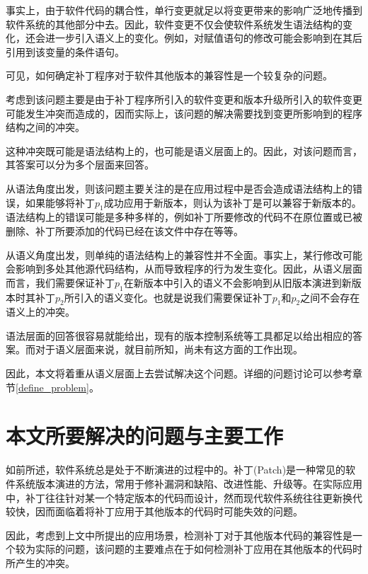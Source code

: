 事实上，由于软件代码的耦合性，单行变更就足以将变更带来的影响广泛地传播到软件系统的其他部分中去\cite{wilkerson2012software,tao2012software}。因此，软件变更不仅会使软件系统发生语法结构的变化，还会进一步引入语义上的变化。例如，对赋值语句的修改可能会影响到在其后引用到该变量的条件语句。

可见，如何确定补丁程序对于软件其他版本的兼容性是一个较复杂的问题。

考虑到该问题主要是由于补丁程序所引入的软件变更和版本升级所引入的软件变更可能发生冲突而造成的，因而实际上，该问题的解决需要找到变更所影响到的程序结构之间的冲突。

这种冲突既可能是语法结构上的，也可能是语义层面上的。因此，对该问题而言，其答案可以分为多个层面来回答。

从语法角度出发，则该问题主要关注的是在应用过程中是否会造成语法结构上的错误，如果能够将补丁$p_1$成功应用于新版本，则认为该补丁是可以兼容于新版本的。语法结构上的错误可能是多种多样的，例如补丁所要修改的代码不在原位置或已被删除、补丁所要添加的代码已经在该文件中存在等等。

从语义角度出发，则单纯的语法结构上的兼容性并不全面。事实上，某行修改可能会影响到多处其他源代码结构，从而导致程序的行为发生变化。因此，从语义层面而言，我们需要保证补丁$p_1$在新版本中引入的语义不会影响到从旧版本演进到新版本时其补丁$p_2$所引入的语义变化。也就是说我们需要保证补丁$p_1$和$p_2$之间不会存在语义上的冲突。

语法层面的回答很容易就能给出，现有的版本控制系统等工具都足以给出相应的答案。而对于语义层面来说，就目前所知，尚未有这方面的工作出现。

因此，本文将着重从语义层面上去尝试解决这个问题。详细的问题讨论可以参考章节\ref {define_problem}。


\section{本文所要解决的问题与主要工作}

如前所述，软件系统总是处于不断演进的过程中的。补丁(Patch)是一种常见的软件系统版本演进的方法，常用于修补漏洞和缺陷、改进性能、升级等。在实际应用中，补丁往往针对某一个特定版本的代码而设计，然而现代软件系统往往更新换代较快，因而面临着将补丁应用于其他版本的代码时可能失效的问题。


因此，考虑到上文中所提出的应用场景，检测补丁对于其他版本代码的兼容性是一个较为实际的问题，该问题的主要难点在于如何检测补丁应用在其他版本的代码时所产生的冲突。

